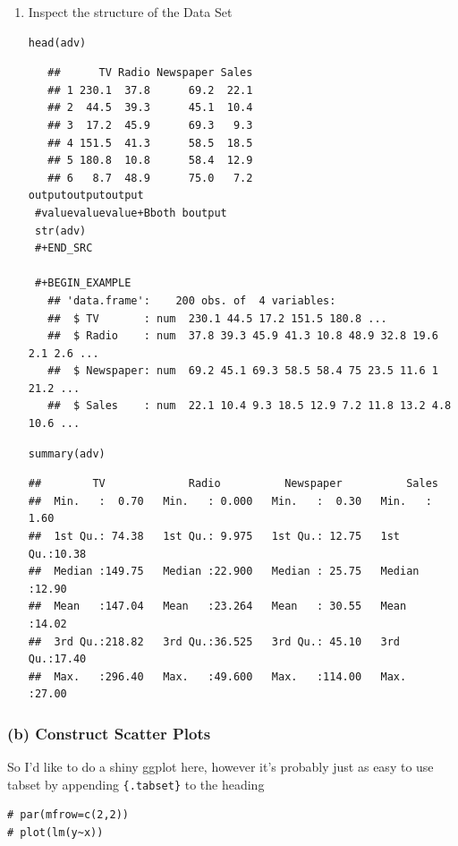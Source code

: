 \documentclass[11pt]{article}
\begin{document}
\begin{enumerate}
\item Inspect the structure of the Data Set
\label{sec:orgd878f52}
\begin{verbatim}
head(adv)
\end{verbatim}

\begin{verbatim}
   ##      TV Radio Newspaper Sales
   ## 1 230.1  37.8      69.2  22.1
   ## 2  44.5  39.3      45.1  10.4
   ## 3  17.2  45.9      69.3   9.3
   ## 4 151.5  41.3      58.5  18.5
   ## 5 180.8  10.8      58.4  12.9
   ## 6   8.7  48.9      75.0   7.2
outputoutputoutput
 #valuevaluevalue+Bboth boutput 
 str(adv)
 #+END_SRC

 #+BEGIN_EXAMPLE
   ## 'data.frame':    200 obs. of  4 variables:
   ##  $ TV       : num  230.1 44.5 17.2 151.5 180.8 ...
   ##  $ Radio    : num  37.8 39.3 45.9 41.3 10.8 48.9 32.8 19.6 2.1 2.6 ...
   ##  $ Newspaper: num  69.2 45.1 69.3 58.5 58.4 75 23.5 11.6 1 21.2 ...
   ##  $ Sales    : num  22.1 10.4 9.3 18.5 12.9 7.2 11.8 13.2 4.8 10.6 ...
\end{verbatim}

\begin{verbatim}
summary(adv)
\end{verbatim}

\begin{verbatim}
##        TV             Radio          Newspaper          Sales
##  Min.   :  0.70   Min.   : 0.000   Min.   :  0.30   Min.   : 1.60
##  1st Qu.: 74.38   1st Qu.: 9.975   1st Qu.: 12.75   1st Qu.:10.38
##  Median :149.75   Median :22.900   Median : 25.75   Median :12.90
##  Mean   :147.04   Mean   :23.264   Mean   : 30.55   Mean   :14.02
##  3rd Qu.:218.82   3rd Qu.:36.525   3rd Qu.: 45.10   3rd Qu.:17.40
##  Max.   :296.40   Max.   :49.600   Max.   :114.00   Max.   :27.00
\end{verbatim}
\end{enumerate}
\subsubsection{(b) Construct Scatter Plots}
\label{sec:org0ca3ddf}
So I'd like to do a shiny ggplot here, however it's probably just as
easy to use tabset by appending \texttt{\{.tabset\}} to the heading

\begin{verbatim}
# par(mfrow=c(2,2))
# plot(lm(y~x))
\end{verbatim}
\end{document}
